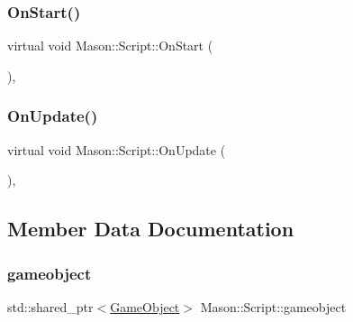 \hypertarget{class_mason_1_1_script_aa42915c752bb7f4623ca679b222edf2f}{}\label{class_mason_1_1_script_aa42915c752bb7f4623ca679b222edf2f} 
\subsubsection{\texorpdfstring{On\+Start()}{OnStart()}}
{\footnotesize\ttfamily virtual void Mason\+::\+Script\+::\+On\+Start (\begin{DoxyParamCaption}{ }\end{DoxyParamCaption})\hspace{0.3cm}{\ttfamily [inline]}, {\ttfamily [virtual]}}

\hypertarget{class_mason_1_1_script_acafa4283460fb677484bb43ebec37743}{}\label{class_mason_1_1_script_acafa4283460fb677484bb43ebec37743} 
\subsubsection{\texorpdfstring{On\+Update()}{OnUpdate()}}
{\footnotesize\ttfamily virtual void Mason\+::\+Script\+::\+On\+Update (\begin{DoxyParamCaption}{ }\end{DoxyParamCaption})\hspace{0.3cm}{\ttfamily [inline]}, {\ttfamily [virtual]}}



\subsection{Member Data Documentation}
\hypertarget{class_mason_1_1_script_a26ffab9ad2a0f22cb6a3cba3029a985f}{}\label{class_mason_1_1_script_a26ffab9ad2a0f22cb6a3cba3029a985f} 
\subsubsection{\texorpdfstring{gameobject}{gameobject}}
{\footnotesize\ttfamily std\+::shared\+\_\+ptr$<$\hyperlink{class_mason_1_1_game_object}{Game\+Object}$>$ Mason\+::\+Script\+::gameobject}

\hypertarget{class_mason_1_1_script_a480aa8b8f65245d51e41ceeaf9cab93a}{}\label{class_mason_1_1_script_a480aa8b8f65245d51e41ceeaf9cab93a} 
